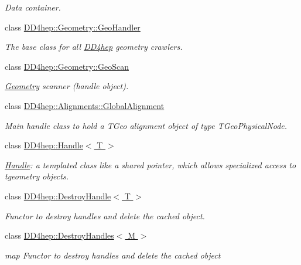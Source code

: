 \begin{DoxyCompactItemize}
\begin{DoxyCompactList}\small\item\em Data container. \item\end{DoxyCompactList}\item 
class \hyperlink{class_d_d4hep_1_1_geometry_1_1_geo_handler}{DD4hep::Geometry::GeoHandler}
\begin{DoxyCompactList}\small\item\em The base class for all \hyperlink{namespace_d_d4hep}{DD4hep} geometry crawlers. \item\end{DoxyCompactList}\item 
class \hyperlink{class_d_d4hep_1_1_geometry_1_1_geo_scan}{DD4hep::Geometry::GeoScan}
\begin{DoxyCompactList}\small\item\em \hyperlink{namespace_d_d4hep_1_1_geometry}{Geometry} scanner (handle object). \item\end{DoxyCompactList}\item 
class \hyperlink{class_d_d4hep_1_1_alignments_1_1_global_alignment}{DD4hep::Alignments::GlobalAlignment}
\begin{DoxyCompactList}\small\item\em Main handle class to hold a TGeo alignment object of type TGeoPhysicalNode. \item\end{DoxyCompactList}\item 
class \hyperlink{class_d_d4hep_1_1_handle}{DD4hep::Handle$<$ T $>$}
\begin{DoxyCompactList}\small\item\em \hyperlink{class_d_d4hep_1_1_handle}{Handle}: a templated class like a shared pointer, which allows specialized access to tgeometry objects. \item\end{DoxyCompactList}\item 
class \hyperlink{class_d_d4hep_1_1_destroy_handle}{DD4hep::DestroyHandle$<$ T $>$}
\begin{DoxyCompactList}\small\item\em Functor to destroy handles and delete the cached object. \item\end{DoxyCompactList}\item 
class \hyperlink{class_d_d4hep_1_1_destroy_handles}{DD4hep::DestroyHandles$<$ M $>$}
\begin{DoxyCompactList}\small\item\em map Functor to destroy handles and delete the cached object \item\end{DoxyCompactList}\item 

\end{DoxyCompactItemize}
